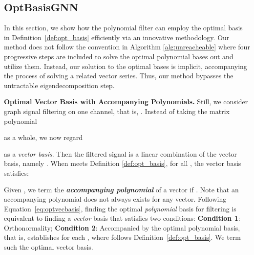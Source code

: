 \subsection{OptBasisGNN}

In this section, we show how the polynomial filter 
can employ the optimal basis in Definition~\ref{def:opt_basis} 
efficiently via an innovative  methodology. 
Our method does not follow the convention in  
Algorithm \ref{alg:unreacheable} 
where four progressive steps  
are included to solve the optimal polynomial bases out and utilize them.   
Instead, our solution to the optimal bases is implicit, 
accompanying the process of solving a related vector series. 
Thus, our method bypasses the untractable eigendecomposition step.



\textbf{Optimal Vector Basis with Accompanying Polynomials.\quad} 
Still, we consider graph signal filtering on one channel, 
that is,
.
Instead of taking the matrix polynomial 

as a whole, 
we now regard 

as a \textit{vector basis}. 
Then the filtered signal  is a linear combination of 
the vector basis, namely 
.
When  meets Definition \ref{def:opt_basis}, 
for all , 
the vector basis satisfies:



Given , 
we term  the \textit{\textbf{accompanying polynomial}} of a vector 
if . 
Note that an accompanying polynomial does not always exists for any vector. 
Following Equation~\eqref{eq:optvecbasis}, finding the optimal \textit{polynomial} basis for filtering  
is equivalent to finding a \textit{vector} basis  that 
satisfies two conditions: 
\textbf{Condition 1}: Orthonormality; 
\textbf{Condition 2}:  Accompanied by the optimal polynomial basis, that is, 
 establishes for each , 
where  follows Definition~\ref{def:opt_basis}.
We term such  the optimal vector basis.


